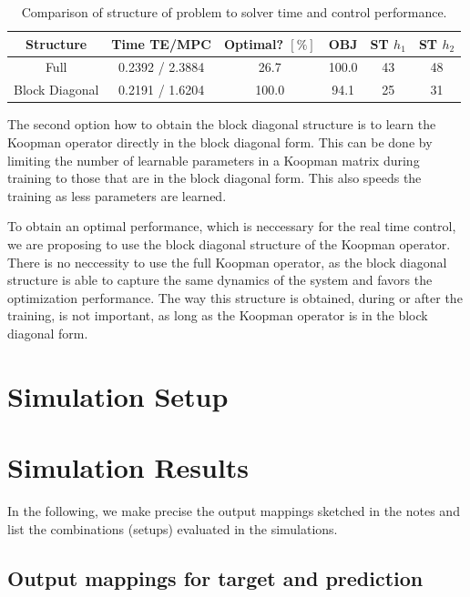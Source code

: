 \documentclass[preprint,12pt,authoryear]{elsarticle}
\begin{document}
\begin{table}[h]
  \centering
  \caption{Comparison of structure of problem to solver time and control performance.}
  \label{tab:block-diagonal}
  \begin{tabular}{cccccc}
      \toprule
        Structure & Time TE/MPC & Optimal? \([\%]\) & OBJ & ST \(h_1\) & ST \(h_2\) \\
        \midrule
        Full          & 0.2392 / 2.3884 & 26.7 & 100.0 & 43 & 48 \\
        Block Diagonal & 0.2191 / 1.6204 & 100.0 & 94.1 & 25 & 31 \\
        \bottomrule
  \end{tabular}
\end{table}

The second option how to obtain the block diagonal structure is to learn the Koopman operator directly in the block diagonal form. This can be done by limiting the number of learnable parameters in a Koopman matrix during training to those that are in the block diagonal form. This also speeds the training as less parameters are learned.

To obtain an optimal performance, which is neccessary for the real time control, we are proposing to use the block diagonal structure of the Koopman operator. There is no neccessity to use the full Koopman operator, as the block diagonal structure is able to capture the same dynamics of the system and favors the optimization performance. The way this structure is obtained, during or after the training, is not important, as long as the Koopman operator is in the block diagonal form.

\section{Simulation Setup}

\section{Simulation Results}
\label{sec:Results}

In the following, we make precise the output mappings sketched in the notes and list the combinations (setups) evaluated in the simulations.

\subsection{Output mappings for target and prediction}
\end{document}
